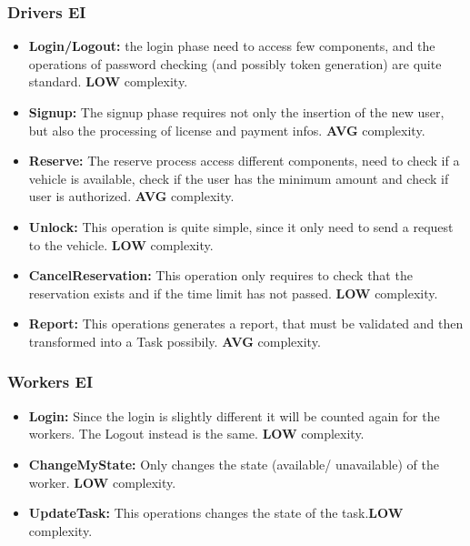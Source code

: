 \subsubsection{Drivers EI}
\begin{itemize}
\item \textbf{Login/Logout:} the login phase need to access few components, and the operations of password checking (and possibly token generation) are quite standard. \textbf{LOW} complexity.
	\item \textbf{Signup:} The signup phase requires not only the insertion of the new user, but also the processing of license and payment infos. \textbf{AVG} complexity.
	
	\item \textbf{Reserve:} The reserve process access different components, need to check if a vehicle is available, check if the user has the minimum amount and check if user is authorized. \textbf{AVG} complexity.
	
	\item \textbf{Unlock:} This operation is quite simple, since it only need to send a request to the vehicle. \textbf{LOW} complexity.

	\item \textbf{CancelReservation:} This operation only requires to check that the reservation exists and if the time limit has not passed. \textbf{LOW} complexity.
	
	\item \textbf{Report:} This operations generates a report, that must be validated and then transformed into a Task possibily. \textbf{AVG} complexity. 
\end{itemize}
\subsubsection{Workers EI}
\begin{itemize}
	\item \textbf{Login:} Since the login is slightly different it will be counted again for the workers. The Logout instead is the same. \textbf{LOW} complexity.

	\item \textbf{ChangeMyState:} Only changes the state (available/ unavailable) of the worker. \textbf{LOW} complexity.
	
	\item \textbf{UpdateTask:} This operations changes the state of the task.\textbf{LOW} complexity. 
\end{itemize}
